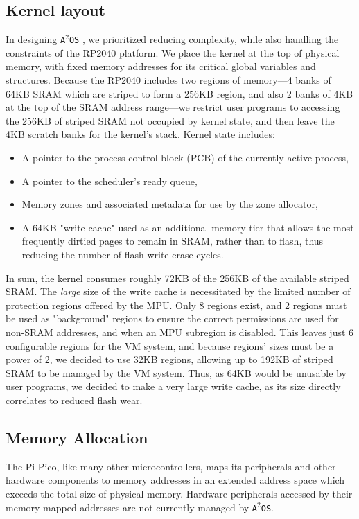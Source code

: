 \documentclass[12pt]{article}
\newcommand{\os}{\texttt{A$^2$OS} }
\newcommand{\osns}{\texttt{A$^2$OS}}
\begin{document}
\subsection{Kernel layout}
In designing \os, we prioritized reducing complexity, while also handling the
constraints of the RP2040 platform. We place the kernel at the top of physical
memory, with fixed memory addresses for its critical global variables and
structures. Because the RP2040 includes two regions of memory---4 banks of 64KB
SRAM which are striped to form a 256KB region, and also 2 banks of 4KB at the
top of the SRAM address range---we restrict user programs to accessing the 256KB
of striped SRAM not occupied by kernel state, and then leave the 4KB scratch
banks for the kernel's stack. Kernel state includes:
\begin{itemize}
    \item {A pointer to the process control block (PCB) of the currently active
    process,}
    \item A pointer to the scheduler's ready queue,
    \item Memory zones and associated metadata for use by the zone allocator,
    \item {A 64KB "write cache" used as an additional memory tier that allows
    the most frequently dirtied pages to remain in SRAM, rather than to flash,
    thus reducing the number of flash write-erase cycles.}
\end{itemize}
In sum, the kernel consumes roughly 72KB of the 256KB of the available striped
SRAM. The \emph{large} size of the write cache is necessitated by the limited
number of protection regions offered by the MPU. Only 8 regions exist, and 2
regions must be used as "background" regions to ensure the correct permissions
are used for non-SRAM addresses, and when an MPU subregion is disabled. This
leaves just 6 configurable regions for the VM system, and because regions' sizes
must be a power of 2, we decided to use 32KB regions, allowing up to 192KB of
striped SRAM to be managed by the VM system. Thus, as 64KB would be unusable by
user programs, we decided to make a very large write cache, as its size directly
correlates to reduced flash wear.

\subsection{Memory Allocation}
The Pi Pico, like many other microcontrollers, maps its peripherals and other
hardware components to memory addresses in an extended address space which
exceeds the total size of physical memory. Hardware peripherals accessed by
their memory-mapped addresses are not currently managed by \osns.
\end{document}
